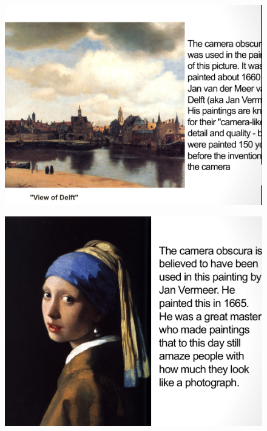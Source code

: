 \documentclass{beamer}
\begin{document}
\begin{frame}
	\begin{figure}
		\centering
		\includegraphics[scale=0.4]{69.jpg}
	\end{figure}
\end{frame}

\begin{frame}
	\begin{figure}
		\centering
		\includegraphics[scale=0.4]{70.jpg}
	\end{figure}
\end{frame}
\end{document}
